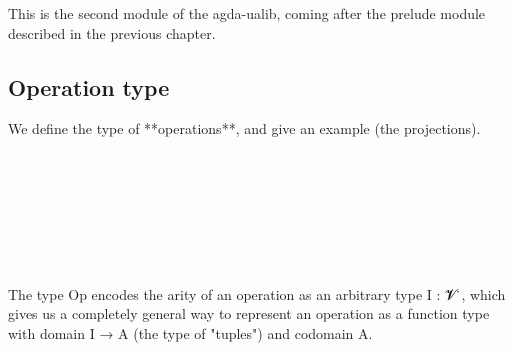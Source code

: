 \documentclass[sigplan,screen]{acmart}
\begin{document}
This is the second module of the agda-ualib, coming after the prelude module described in the previous chapter.

\subsection{Operation type}

We define the type of **operations**, and give an example (the projections).

\begin{code}%
\>[0]\<%
\\
\>[0]\AgdaSpace{}%
\AgdaSymbol{:}\AgdaSpace{}%
\AgdaSpace{}%
\AgdaSpace{}%
\AgdaSpace{}%
\AgdaSpace{}%
\AgdaSpace{}%
\AgdaSpace{}%
\AgdaSpace{}%
\AgdaSpace{}%
\AgdaSpace{}%
\<%
\\
\>[0]\AgdaSpace{}%
\AgdaSpace{}%
\AgdaSpace{}%
\AgdaSymbol{=}\AgdaSpace{}%
\AgdaSymbol{(}\AgdaSpace{}%
\AgdaSpace{}%
\AgdaSymbol{)}\AgdaSpace{}%
\AgdaSpace{}%
\<%
\\
%
\\[\AgdaEmptyExtraSkip]%
\>[0]\<%
\\
\>[0]\AgdaSpace{}%
\AgdaSymbol{:}\AgdaSpace{}%
\AgdaSymbol{\{}\AgdaSpace{}%
\AgdaSymbol{:}\AgdaSpace{}%
\AgdaSpace{}%
\AgdaSpace{}%
\AgdaSymbol{\}}\AgdaSpace{}%
\AgdaSymbol{\{}\AgdaSpace{}%
\AgdaSymbol{:}\AgdaSpace{}%
\AgdaSpace{}%
\AgdaSpace{}%
\AgdaSymbol{\}}\AgdaSpace{}%
\AgdaSpace{}%
\AgdaSpace{}%
\AgdaSpace{}%
\AgdaSpace{}%
\AgdaSpace{}%
\<%
\\
\>[0]\AgdaSpace{}%
\AgdaSpace{}%
\AgdaSpace{}%
\AgdaSymbol{=}\AgdaSpace{}%
\AgdaSpace{}%
\<%
\end{code}

The type Op encodes the arity of an operation as an arbitrary type I : 𝓥 ̇, which gives us a completely general way to represent an operation as a function type with domain I → A (the type of "tuples") and codomain A.
\end{document}
